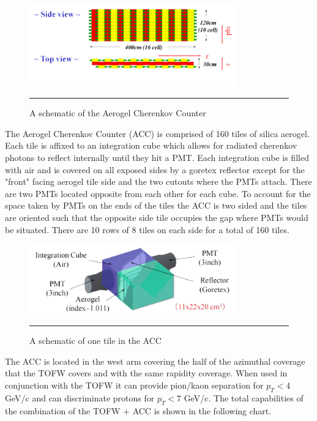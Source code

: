 \begin{figure}[htbp!]
  \centering
    \includegraphics[width=0.8\textwidth]{Figures/ACCschematic.jpg}
    \rule{35em}{0.5pt}
  \caption[A schematic of the Aerogel Cherenkov Counter]{A schematic of the Aerogel Cherenkov Counter}
  \label{fig:ACCschematic}
\end{figure}

The Aerogel Cherenkov Counter (ACC) is comprised of 160 tiles of silica aerogel. Each tile is affixed to an integration cube which allows for radiated cherenkov photons to reflect internally until they hit a PMT. Each integration cube is filled with air and is covered on all exposed sides by a goretex reflector except for the "front" facing aerogel tile side and the two cutouts where the PMTs attach. There are two PMTs located opposite from each other for each cube. To account for the space taken by PMTs on the ends of the tiles the ACC is two sided and the tiles are oriented such that the opposite side tile occupies the gap where PMTs would be situated.  There are 10 rows of 8 tiles on each side for a total of 160 tiles.

\begin{figure}[htbp!]
  \centering
    \includegraphics[width=0.8\textwidth]{Figures/aerogelchannel.JPG}
    \rule{35em}{0.5pt}
  \caption[A schematic of one tile in the ACC]{A schematic of one tile in the ACC}
  \label{fig:accchannel}
\end{figure}

The ACC is located in the west arm covering the half of the azimuthal coverage that the TOFW covers and with the same rapidity coverage. When used in conjunction with the TOFW it can provide pion/kaon separation for $p_{T} < 4$ GeV/c and can discriminate protons for $p_{T} < 7$ GeV/c.  The total capabilities of the combination of the TOFW + ACC is shown in the following chart.

